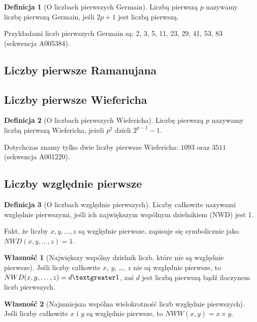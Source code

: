 \documentclass[10pt,onecolumn]{article}
\theoremstyle{definition}
\newtheorem{definition}{Definicja}
\theoremstyle{hypothesis}
\theoremstyle{capability}
\newtheorem{capability}{Własność}
\begin{document}
\begin{definition}[O liczbach pierwszych Germain]
Liczbą pierwszą $p$ nazywamy liczbę pierwszą Germain, jeśli $2p+1$ jest liczbą pierwszą.
\end{definition}

Przykładami liczb pierwszych Germain są: 2, 3, 5, 11, 23, 29, 41, 53, 83 (sekwencja A005384).

\subsection{Liczby pierwsze Ramanujana}

\subsection{Liczby pierwsze Wiefericha}

\begin{definition}[O liczbach pierwszych Wiefericha]
Liczbę pierwszą $p$ nazywamy liczbą pierwszą Wiefericha, jeżeli $p^{2}$ dzieli $2^{p-1}-1$.
\end{definition}

Dotychczas znamy tylko dwie liczby pierwsze Wiefericha: $1093$ oraz $3511$ (sekwencja A001220).

\subsection{Liczby względnie pierwsze}

\begin{definition}[O liczbach względnie pierwszych]
Liczby całkowite nazywami względnie pierwszymi, jeśli ich największym wspólnym dzielnikiem (NWD) jest 1.
\end{definition}

Fakt, że liczby $x, y, \dots , z$ są względnie pierwsze, zapisuje się symbolicznie jako $NWD (x, y,\dots ,z)=1$. 

\begin{capability}[Największy wspólny dzielnik liczb, które nie są względnie pierwsze]
Jeśli liczby całkowite $x$, $y$, \dots, $z$ nie są względnie pierwsze, to $NWD (x, y,\dots ,z) = d \textgreater 1$, zaś $d$ jest liczbą pierwszą bądź iloczynem liczb pierwszych.
\end{capability}

\begin{capability}[Najmniejsza wspólna wielokrotność liczb względnie pierwszych]
Jeśli liczby całkowite $x$ i $y$ są względnie pierwsze, to $NWW (x, y) = x \times y$.
\end{capability}
\end{document}
